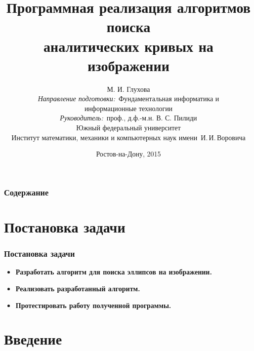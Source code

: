 \documentclass[14pt]{beamer}
\title{\small{Программная реализация алгоритмов поиска \\аналитических кривых на изображении}}
\author{\small{%
М. И. Глухова\\%
\emph{Направление подготовки:}~Фундаментальная информатика и \\информационные технологии\\%
\emph{Руководитель:}~проф., д.ф.-м.н. В. С. Пилиди}\\%
\vspace{15pt}%
    Южный федеральный университет\\
	Институт математики, механики и компьютерных наук
    имени~И.\,И.\,Воровича%
}
\date{\small{Ростов-на-Дону, 2015}}
\begin{document}
\maketitle

\begin{frame}
\frametitle{Содержание} %
\tableofcontents %
\end{frame}

\section{Постановка задачи}

\begin{frame}
\frametitle{Постановка задачи}
\begin{itemize}
  \item \textbf{Разработать алгоритм для поиска эллипсов на изображении.} 
  \item \textbf{Реализовать разработанный алгоритм.} 
  \item \textbf{Протестировать работу полученной программы.} 
\end{itemize}
\end{frame}

\section{Введение}
\end{document}
